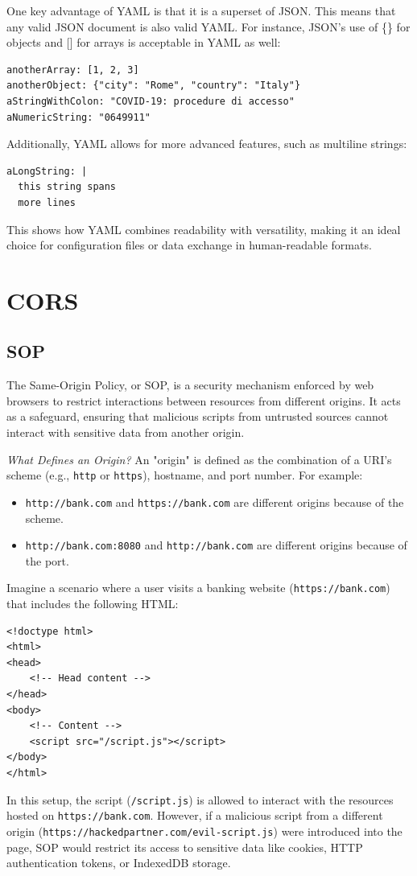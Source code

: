 One key advantage of YAML is that it is a superset of JSON. This means that any valid JSON document is also valid YAML. For instance, JSON's use of \{\} for objects and [] for arrays is acceptable in YAML as well:
\begin{lstlisting}
anotherArray: [1, 2, 3]
anotherObject: {"city": "Rome", "country": "Italy"}
aStringWithColon: "COVID-19: procedure di accesso"
aNumericString: "0649911"
\end{lstlisting}
Additionally, YAML allows for more advanced features, such as multiline strings:
\begin{lstlisting}
aLongString: |
  this string spans
  more lines
\end{lstlisting}
This shows how YAML combines readability with versatility, making it an ideal choice for configuration files or data exchange in human-readable formats.

\section{CORS}
\subsection*{SOP}
The Same-Origin Policy, or SOP, is a security mechanism enforced by web browsers to restrict interactions between resources from different origins. It acts as a safeguard, ensuring that malicious scripts from untrusted sources cannot interact with sensitive data from another origin.

\textit{What Defines an Origin?}
An "origin" is defined as the combination of a URI’s scheme (e.g., \texttt{http} or \texttt{https}), hostname, and port number. For example:
\begin{itemize}
    \item \texttt{http://bank.com} and \texttt{https://bank.com} are different origins because of the scheme.
    \item \texttt{http://bank.com:8080} and \texttt{http://bank.com} are different origins because of the port.
\end{itemize}
Imagine a scenario where a user visits a banking website (\texttt{https://bank.com}) that includes the following HTML:
\begin{verbatim}
<!doctype html>
<html>
<head>
    <!-- Head content -->
</head>
<body>
    <!-- Content -->
    <script src="/script.js"></script>
</body>
</html>
\end{verbatim}
In this setup, the script (\texttt{/script.js}) is allowed to interact with the resources hosted on \texttt{https://bank.com}. However, if a malicious script from a different origin (\texttt{https://hackedpartner.com/evil-script.js}) were introduced into the page, SOP would restrict its access to sensitive data like cookies, HTTP authentication tokens, or IndexedDB storage.

